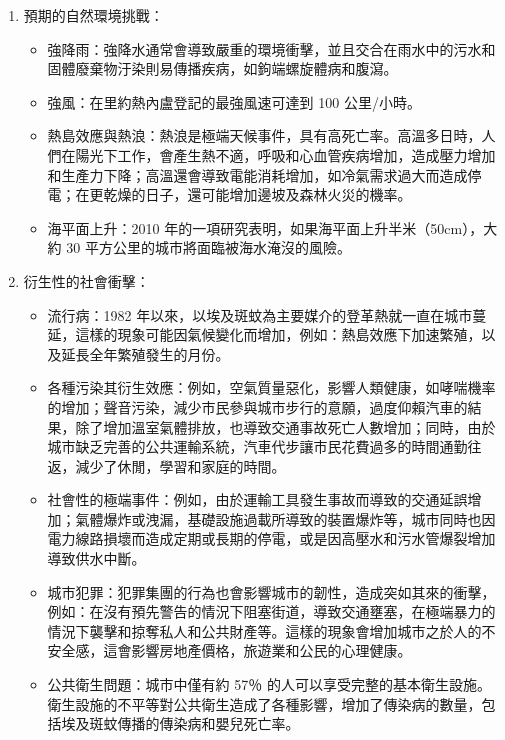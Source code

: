 \documentclass[a4paper,12pt]{article}
\begin{document}
\begin{enumerate}
\begin{enumerate}
\begin{enumerate}
\item 預期的自然環境挑戰：
\label{sec:orge368a73}

\begin{itemize}
\item 強降雨：強降水通常會導致嚴重的環境衝擊，並且交合在雨水中的污水和固體廢棄物汙染則易傳播疾病，如鉤端螺旋體病和腹瀉。\\
\item 強風：在里約熱內盧登記的最強風速可達到 100 公里/小時。\\
\item 熱島效應與熱浪：熱浪是極端天候事件，具有高死亡率。高溫多日時，人們在陽光下工作，會產生熱不適，呼吸和心血管疾病增加，造成壓力增加和生產力下降；高溫還會導致電能消耗增加，如冷氣需求過大而造成停電；在更乾燥的日子，還可能增加邊坡及森林火災的機率。\\
\item 海平面上升：2010 年的一項研究表明，如果海平面上升半米（50cm），大約 30 平方公里的城市將面臨被海水淹沒的風險。\\
\end{itemize}
\item 衍生性的社會衝擊：
\label{sec:orgc10b85c}

\begin{itemize}
\item 流行病：1982 年以來，以埃及斑蚊為主要媒介的登革熱就一直在城市蔓延，這樣的現象可能因氣候變化而增加，例如：熱島效應下加速繁殖，以及延長全年繁殖發生的月份。\\
\item 各種污染其衍生效應：例如，空氣質量惡化，影響人類健康，如哮喘機率的增加；聲音污染，減少市民參與城市步行的意願，過度仰賴汽車的結果，除了增加溫室氣體排放，也導致交通事故死亡人數增加；同時，由於城市缺乏完善的公共運輸系統，汽車代步讓市民花費過多的時間通勤往返，減少了休閒，學習和家庭的時間。\\
\item 社會性的極端事件：例如，由於運輸工具發生事故而導致的交通延誤增加；氣體爆炸或洩漏，基礎設施過載所導致的裝置爆炸等，城市同時也因電力線路損壞而造成定期或長期的停電，或是因高壓水和污水管爆裂增加導致供水中斷。\\
\item 城市犯罪：犯罪集團的行為也會影響城市的韌性，造成突如其來的衝擊，例如：在沒有預先警告的情況下阻塞街道，導致交通壅塞，在極端暴力的情況下襲擊和掠奪私人和公共財產等。這樣的現象會增加城市之於人的不安全感，這會影響房地產價格，旅遊業和公民的心理健康。\\
\item 公共衛生問題：城市中僅有約 57％ 的人可以享受完整的基本衛生設施。衛生設施的不平等對公共衛生造成了各種影響，增加了傳染病的數量，包括埃及斑蚊傳播的傳染病和嬰兒死亡率。\\
\end{itemize}
\end{enumerate}


\end{enumerate}
\end{enumerate}
\end{document}
